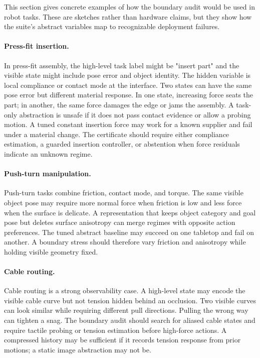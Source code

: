 \documentclass{article}
\begin{document}
This section gives concrete examples of how the boundary audit would be used in
robot tasks. These are sketches rather than hardware claims, but they show how
the suite's abstract variables map to recognizable deployment failures.

\paragraph{Press-fit insertion.}
In press-fit assembly, the high-level task label might be "insert part" and the
visible state might include pose error and object identity. The hidden variable is
local compliance or contact mode at the interface. Two states can have the same
pose error but different material response. In one state, increasing force seats
the part; in another, the same force damages the edge or jams the assembly. A
task-only abstraction is unsafe if it does not pass contact evidence or allow a
probing motion. A tuned constant insertion force may work for a known supplier
and fail under a material change. The certificate should require either
compliance estimation, a guarded insertion controller, or abstention when force
residuals indicate an unknown regime.

\paragraph{Push-turn manipulation.}
Push-turn tasks combine friction, contact mode, and torque. The same visible
object pose may require more normal force when friction is low and less force
when the surface is delicate. A representation that keeps object category and
goal pose but deletes surface anisotropy can merge regimes with opposite action
preferences. The tuned abstract baseline may succeed on one tabletop and fail on
another. A boundary stress should therefore vary friction and anisotropy while
holding visible geometry fixed.

\paragraph{Cable routing.}
Cable routing is a strong observability case. A high-level state may encode the
visible cable curve but not tension hidden behind an occlusion. Two visible
curves can look similar while requiring different pull directions. Pulling the
wrong way can tighten a snag. The boundary audit should search for aliased cable
states and require tactile probing or tension estimation before high-force
actions. A compressed history may be sufficient if it records tension response
from prior motions; a static image abstraction may not be.
\end{document}
